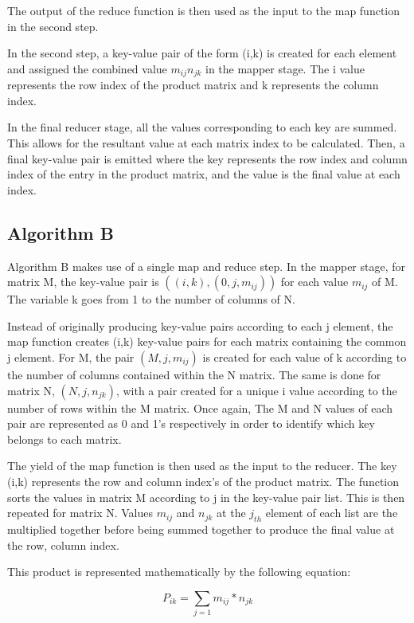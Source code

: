 \documentclass[10pt,twocolumn]{witseiepaper}
\begin{document}
The output of the reduce function is then used as the input to the map function in the second step.

In the second step, a key-value pair of the form (i,k) is created for each element and assigned the combined value $m_{ij}n_{jk}$ in the mapper stage. The i value represents the row index of the product matrix and k represents the column index. 

In the final reducer stage, all the values corresponding to each key are summed. This allows for the resultant value at each matrix index to be calculated. Then, a final key-value pair is emitted where the key represents the row index and column index of the entry in the product matrix, and the value is the final value at each index.

\subsection{Algorithm B}

Algorithm B makes use of a single map and reduce step. In the mapper stage, for matrix M, the key-value pair is $((i, k), (0, j, m_{ij}))$ for each value $m_{ij}$ of M. The variable k goes from 1 to the number of columns of N. 

Instead of originally producing key-value pairs according to each j element, the map function creates (i,k) key-value pairs for each matrix containing the common j element. For M, the pair $(M, j, m_{ij})$ is created for each value of k according to the number of columns contained within the N matrix. The same is done for matrix N, $(N, j,n_{jk})$, with a pair created for a unique i value according to the number of rows within the M matrix. Once again, The M and N values of each pair are represented as 0 and 1's respectively in order to identify which key belongs to each matrix.
	
The yield of the map function is then used as the input to the reducer. The key (i,k) represents the row and column index's of the product matrix. The function sorts the values in matrix M according to j in the key-value pair list. This is then repeated for matrix N. Values $m_{ij}$ and $n_{jk}$ at the $j_{th}$ element of each list are the multiplied together before being summed together to produce the final value at the row, column index. 

This product is represented mathematically by the following equation:

 \begin{equation}
P_{ik}= \sum _{j = 1} m_{ij} * n_{jk}
\label{eqn:multiply}
\end{equation}
\end{document}
